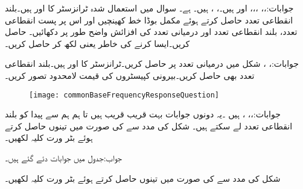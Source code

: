 جوابات:،، ،،،  اور  ہیں۔، ،  ہیں۔ ہے۔
سوال  میں استعمال شدہ ٹرانزسٹر کا  اور  ہیں۔بلند انقطاعی تعدد حاصل کرتے ہوئے مکمل بوڈا خط کھینچیں اور اس پر پست انقطاعی تعدد، بلند انقطاعی تعدد اور درمیانی تعدد کی افزائش  واضح طور پر دکھائیں۔ حاصل کریں۔ایسا کرنے کی خاطر  یعنی  لکھ کر حاصل کریں۔

جوابات:، ، 
شکل  میں درمیانی تعدد پر  حاصل کریں۔ٹرانزسٹر کا  اور  ہیں۔بلند انقطاعی تعدد بھی حاصل کریں۔بیرونی کپیسٹروں کی قیمت لامحدود تصور کریں۔

\begin{figure}
\centering
\texttt{[image: commonBaseFrequencyResponseQuestion]}
\caption{}
\label{شکل_تعددی_ردعمل_سوال_مشترک_قابو_داخلی_اشارہ_برقی_رو}
\end{figure}
جوابات:،، ،  ہیں ۔یہ دونوں جوابات بہت قریب قریب ہیں تا ہم  ہم   سے پیدا  کو بلند انقطاعی تعدد لے سکتے ہیں۔ 
شکل  کی مدد سے  کی صورت میں تینوں  حاصل کرتے ہوئے بٹر ورت کلیہ      لکھیں۔

جواب:جدول  میں جوابات دئے گئے ہیں۔

شکل  کی مدد سے  کی صورت میں تینوں  حاصل کرتے ہوئے بٹر ورت کلیہ      لکھیں۔

